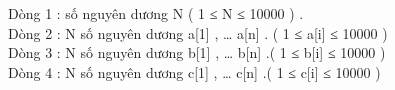 Dòng 1 : số nguyên dương N ( 1 ≤ N ≤ 10000 ) .   
\\   Dòng 2 : N số nguyên dương a[1] , … a[n] . ( 1 ≤ a[i] ≤ 10000 )   
\\   Dòng 3 : N số nguyên dương b[1] , … b[n] .( 1 ≤ b[i] ≤ 10000 )   
\\   Dòng 4 : N số nguyên dương c[1] , … c[n] .( 1 ≤ c[i] ≤ 10000 )  

\